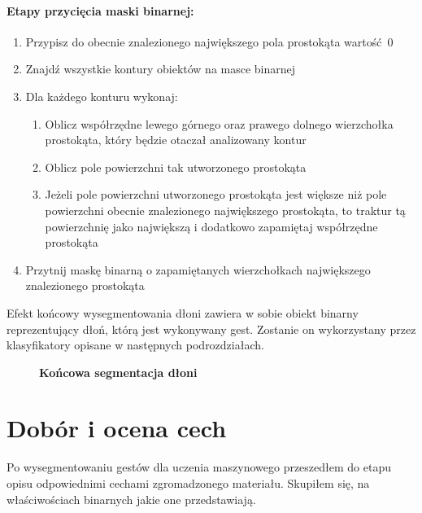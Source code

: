 \documentclass[a4paper,12pt,twoside,openany]{report}
\newcommand{\ImgPath}{.}
\begin{document}
\paragraph{Etapy przycięcia maski binarnej:}
\begin{enumerate}
	\item Przypisz do obecnie znalezionego największego pola prostokąta wartość~0
	\item Znajdź wszystkie kontury obiektów na masce binarnej
	\item Dla każdego konturu wykonaj:
	\begin{enumerate}
		\item Oblicz współrzędne lewego górnego oraz prawego dolnego wierzchołka prostokąta, który będzie otaczał analizowany kontur 
		\item Oblicz pole powierzchni tak utworzonego prostokąta
		\item Jeżeli pole powierzchni utworzonego prostokąta jest większe niż pole powierzchni obecnie znalezionego największego prostokąta, to traktur tą powierzchnię jako największą i dodatkowo zapamiętaj współrzędne prostokąta
	\end{enumerate}
	\item Przytnij maskę binarną o zapamiętanych wierzchołkach największego znalezionego prostokąta
\end{enumerate}

Efekt końcowy wysegmentowania dłoni zawiera w sobie obiekt binarny reprezentujący dłoń, którą jest wykonywany gest. Zostanie on wykorzystany przez klasyfikatory opisane w następnych podrozdziałach.

\begin{figure}[H]
	\centering
	\caption{  \textbf{Końcowa segmentacja dłoni}}
\end{figure} 

\section{Dobór i ocena cech}
Po wysegmentowaniu gestów dla uczenia maszynowego przeszedłem do etapu opisu odpowiednimi cechami zgromadzonego materiału. Skupiłem się, na właściwościach binarnych jakie one przedstawiają.
\end{document}
